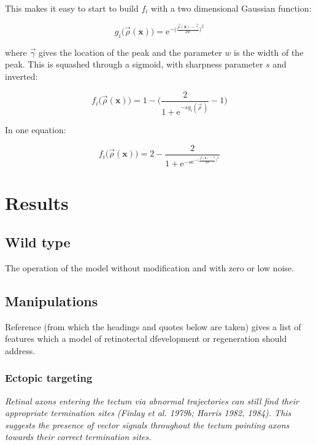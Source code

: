\documentclass[11pt, a4paper]{article}
\newcommand{\mb}[1]{\mathbf{#1}} %
\begin{document}
This makes it easy to start to build $f_i$ with a two dimensional Gaussian
function:

\begin{equation}\label{eq:g}
g_i\big(\vec{\rho}(\mb{x})\big) = \mathrm{e}^{-\big(\frac{\vec{\rho}(\mb{x})-\vec{\gamma}}{2 w}\big)^2 }
\end{equation}

where $\vec{\gamma}$ gives the location of the peak and the parameter $w$ is
the width of the peak. This is squashed through a sigmoid, with
sharpness parameter $s$ and inverted:

\begin{equation}\label{eq:f}
f_i\big(\vec{\rho}(\mb{x})\big) = 1 - \bigg( \frac{2}{1 + \mathrm{e}^{-s
g_i(\vec{\rho}\,)}} - 1 \bigg)
\end{equation}

In one equation:

\begin{equation}\label{eq:gf}
f_i\big(\vec{\rho}(\mb{x})\big) = 2 - \frac{2}{1
+ \mathrm{e}^{-s \mathrm{e}^{-\big(\frac{\vec{\rho}(\mb{x})-\vec{\gamma}}{2 w}\big)^2 } }}
\end{equation}

\section{Results}

\subsection{Wild type}

The operation of the model without modification and with zero or low noise.

\subsection{Manipulations}

Reference \cite{goodhill_development_2005} (from which the headings and quotes
below are taken) gives a list of features which a model of retinotectal
dfevelopment or regeneration should address.

\subsubsection{Ectopic targeting}

\begin{displayquote}
\emph{Retinal axons entering the tectum via abnormal trajectories can still find
their appropriate termination sites (Finlay et al. 1979b; Harris 1982,
1984). This suggests the presence of vector signals throughout the tectum
pointing axons towards their correct termination sites.}
\end{displayquote}
\end{document}
